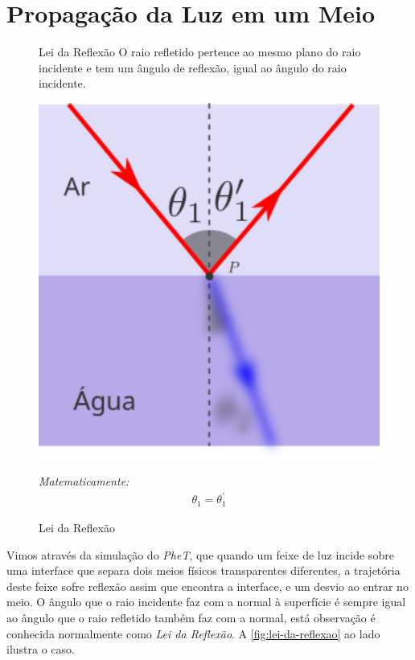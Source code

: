 \section*{Propagação da Luz em um Meio}
\setlength\intextsep{-17pt}
\begin{figure}
\centering
\begin{mybox}[colback=white, colframe=deepred,colbacktitle=deepred!85!deepred,]{Lei da Reflexão}
    O raio refletido pertence ao mesmo plano do raio incidente e tem um ângulo de reflexão, igual ao ângulo do raio incidente.
    
    \includegraphics[width=1\textwidth]{img/reflexao.png}
    \caption{Lei da Reflexão}
    \label{fig:lei-da-reflexao}
    \tcblower
    \emph{Matematicamente:}
    \begin{align}
        \theta_1=\theta_1^{\prime }               
    \end{align}
  \end{mybox}    
\end{figure}
Vimos através da simulação do \emph{PheT}, que quando um feixe de luz incide sobre uma interface que separa dois meios físicos transparentes diferentes, a trajetória deste feixe sofre reflexão assim que encontra a interface, e um desvio ao entrar no meio. O ângulo que o raio incidente faz com a normal à superfície é sempre igual ao ângulo que o raio refletido também faz com a normal, está observação é conhecida normalmente como \emph{Lei da Reflexão}. A \autoref{fig:lei-da-reflexao} ao lado ilustra o caso.       

